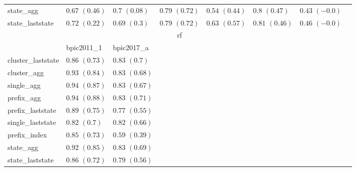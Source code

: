 \documentclass[twoside,11pt]{Latex/Classes/PhDthesisPSnPDF}
\begin{document}
\begin{table}[h]
{\begin{tabular}{llllllll}
		state\_agg & $0.67$ ${(0.46)}$ & $0.7$ ${(0.08)}$ & $0.79$ ${(0.72)}$ & $0.54$ ${(0.44)}$ & $0.8$ ${(0.47)}$ & $0.43$ ${(-0.0)}$ \\
		state\_laststate & $0.72$ ${(0.22)}$ & $0.69$ ${(0.3)}$ & $0.79$ ${(0.72)}$ & $0.63$ ${(0.57)}$ & $0.81$ ${(0.46)}$ & $0.46$ ${(-0.0)}$ \\
		\bottomrule
		\toprule
		& \multicolumn{5}{c}{rf}
		\\
		& bpic2011\_1 & bpic2017\_a
		\\ \midrule
		cluster\_laststate & $0.86$ ${(0.73)}$ & $0.83$ ${(0.7)}$ \\
		cluster\_agg & $0.93$ ${(0.84)}$ & $0.83$ ${(0.68)}$ \\
		single\_agg & $\mathbf{0.94}$ $\mathbf{(0.87)}$  & $0.83$ ${(0.67)}$ \\
		prefix\_agg & $\mathbf{0.94}$ $\mathbf{(0.88)}$  & $0.83$ ${(0.71)}$ \\
		prefix\_laststate & $0.89$ ${(0.75)}$ & $0.77$ ${(0.55)}$ \\
		single\_laststate & $0.82$ ${(0.7)}$ & $0.82$ ${(0.66)}$ \\
		prefix\_index & $0.85$ ${(0.73)}$ & $0.59$ ${(0.39)}$ \\
		state\_agg & $0.92$ ${(0.85)}$ & $0.83$ ${(0.69)}$ \\
		state\_laststate & $0.86$ ${(0.72)}$ & $0.79$ ${(0.56)}$ \\
		\bottomrule
		
		
		\end{tabular}%
	}
\end{table}
\end{document}
